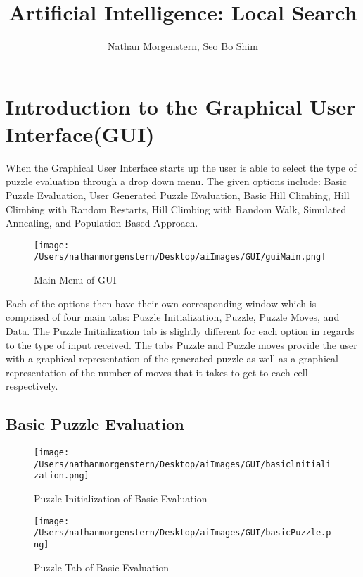 \documentclass{report}
\author{Nathan Morgenstern, Seo Bo Shim}
\title{Artificial Intelligence: Local Search}
\begin{document}
\maketitle
\tableofcontents


\newpage
\section{Introduction to the Graphical User Interface(GUI)}
When the Graphical User Interface starts up the user is able to select the type of puzzle evaluation through a drop down menu. The given options include: Basic Puzzle Evaluation, User Generated Puzzle Evaluation, Basic Hill Climbing, Hill Climbing with Random Restarts, Hill Climbing with Random Walk, Simulated Annealing, and Population Based Approach. 


	\begin{figure}[H]
	\centering
	\texttt{[image: /Users/nathanmorgenstern/Desktop/aiImages/GUI/guiMain.png]}
	\caption{Main Menu of GUI}
	\label{fig: Puzzle Evaluation Main Menu}
	\end{figure}


Each of the options then have their own corresponding window which is comprised of four main tabs: Puzzle Initialization, Puzzle, Puzzle Moves, and Data. The Puzzle Initialization tab is slightly different for each option in regards to the type of input received. The tabs Puzzle and Puzzle moves provide the user with a graphical representation of the generated puzzle as well as a graphical representation of the number of moves that it takes to get to each cell respectively.


\subsection{Basic Puzzle Evaluation}

	\begin{figure}[H]
	\centering
	\texttt{[image: /Users/nathanmorgenstern/Desktop/aiImages/GUI/basiclnitialization.png]}
	\caption{Puzzle Initialization of Basic Evaluation}
	\label{fig: Puzzle Initialization Tab of Basic Evaluation}
	\end{figure}

	\begin{figure}[H]
	\centering
	\texttt{[image: /Users/nathanmorgenstern/Desktop/aiImages/GUI/basicPuzzle.png]}
	\caption{Puzzle Tab of Basic Evaluation}
	\label{fig: Puzzle Tab of Basic Evaluation}
	\end{figure}
\end{document}
